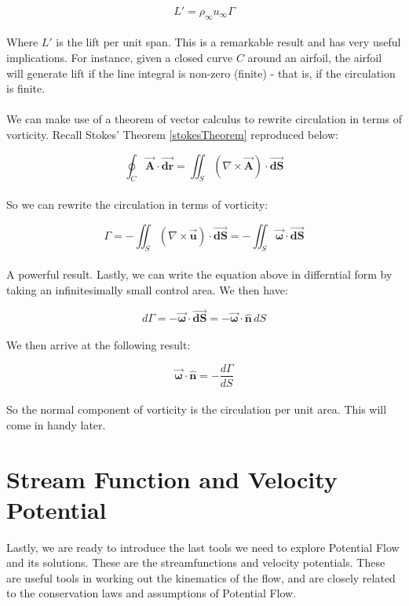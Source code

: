 \documentclass[11pt]{article}
\begin{document}
\begin{equation*}
    L' = \rho_\infty u_\infty \Gamma
\end{equation*}\\
\noindent
Where $L'$ is the lift per unit span. This is a remarkable result and has very useful implications. For instance, given a closed curve $C$ around an airfoil, the airfoil will generate lift if the line integral is non-zero (finite) - that is, if the circulation is finite. \\ \\
\noindent
We can make use of a theorem of vector calculus to rewrite circulation in terms of vorticity. Recall Stokes' Theorem \eqref{stokesTheorem} reproduced below:

\begin{equation*}
    \oint_C \vec{\bm{A}} \cdot \vec{\bm{dr}} = \iint_S (\nabla \times \vec{\bm{A}}) \cdot \vec{\bm{dS}}
\end{equation*} \\
\noindent
So we can rewrite the circulation in terms of vorticity:

\begin{equation*}
    \Gamma = -\iint_S (\nabla \times \vec{\bm{u}}) \cdot \vec{\bm{dS}} = -\iint_S \vec{\bm{\omega}} \cdot \vec{\bm{dS}}
\end{equation*} \\
\noindent
A powerful result. Lastly, we can write the equation above in differntial form by taking an infinitesimally small control area. We then have:

\begin{equation*}
    d\Gamma = -\vec{\bm{\omega}}\cdot\vec{\bm{dS}} = -\vec{\bm{\omega}}\cdot\hat{\bm{n}}\,dS
\end{equation*} \\
We then arrive at the following result:

\begin{equation*}
    \vec{\bm{\omega}}\cdot\hat{\bm{n}} = -\frac{d\Gamma}{dS}
\end{equation*} \\
\noindent
So the normal component of vorticity is the circulation per unit area. This will come in handy later.
\pagebreak

\section{Stream Function and Velocity Potential}
Lastly, we are ready to introduce the last tools we need to explore Potential Flow and its solutions. These are the streamfunctions and velocity potentials. These are useful tools in working out the kinematics of the flow, and are closely related to the conservation laws and assumptions of Potential Flow.
\end{document}
